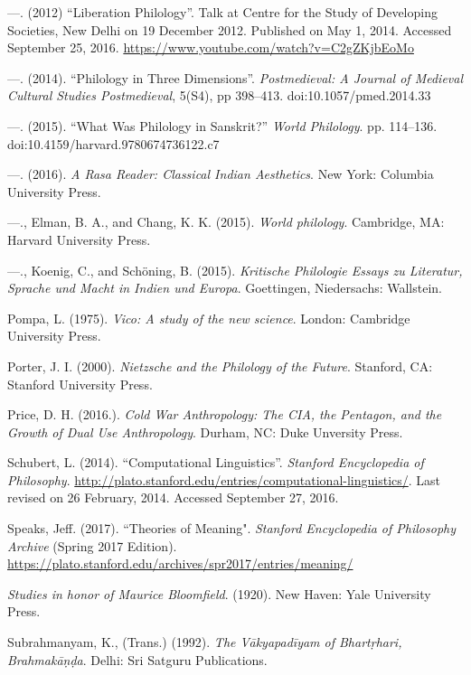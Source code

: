\begin{thebibliography}{99}
  —. (2012) “Liberation Philology”. Talk at Centre for the Study of Developing Societies, New Delhi on 19 December 2012. Published on May 1, 2014. Accessed September 25, 2016. \url{https://www.youtube.com/watch?v=C2gZKjbEoMo}

  —. (2014). “Philology in Three Dimensions”. \textit{Postmedieval: A Journal of Medieval Cultural Studies Postmedieval}, 5(S4), pp 398--413. doi:10.1057/pmed.2014.33

  —. (2015). “What Was Philology in Sanskrit?” \textit{World Philology}. pp. 114--136. doi:10.4159/harvard.9780674736122.c7

  —. (2016). \textit{A Rasa Reader: Classical Indian Aesthetics}. New York: Columbia University Press.

  —., Elman, B. A., and Chang, K. K. (2015). \textit{World philology}. Cambridge, MA: Harvard University Press.

  —., Koenig, C., and Schöning, B. (2015). \textit{Kritische Philologie Essays zu Literatur, Sprache und Macht in Indien und Europa}. Goettingen, Niedersachs: Wallstein.

  Pompa, L. (1975). \textit{Vico: A study of the new science}. London: Cambridge University Press.

  Porter, J. I. (2000). \textit{Nietzsche and the Philology of the Future}. Stanford, CA: Stanford University Press.

  Price, D. H. (2016.). \textit{Cold War Anthropology: The CIA, the Pentagon, and the Growth of Dual Use Anthropology}. Durham, NC: Duke Unversity Press.

  Schubert, L. (2014). “Computational Linguistics”. \textit{Stanford Encyclopedia of Philosophy}. \url{http://plato.stanford.edu/entries/computational-linguistics/}. Last revised on 26 February, 2014. Accessed September 27, 2016.

  Speaks, Jeff. (2017). ``Theories of Meaning". \textit{Stanford Encyclopedia of Philosophy Archive} (Spring 2017 Edition). \url{https://plato.stanford.edu/archives/spr2017/entries/meaning/}

  \textit{Studies in honor of Maurice Bloomfield}. (1920). New Haven: Yale University Press.

  Subrahmanyam, K., (Trans.) (1992). \textit{The Vākyapadīyam of Bhartṛhari, Brahmakāṇḍa}. Delhi: Sri Satguru Publications.


\end{thebibliography}
